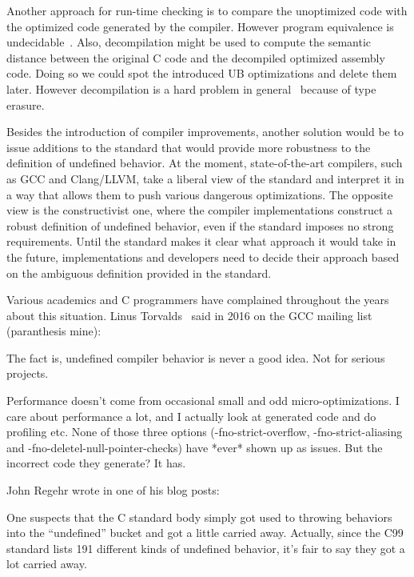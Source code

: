 Another approach for run-time checking is to compare the unoptimized
code with the optimized code generated by the compiler. However program
equivalence is undecidable~\cite{sipser1996introduction}. Also,
decompilation might be used to compute the semantic distance between the
original C code and the decompiled optimized assembly code.  Doing so we
could spot the introduced UB optimizations and delete them later.
However decompilation is a hard problem in
general~\cite{cifuentes1995decompilation} because of type erasure.

Besides the introduction of compiler improvements, another solution
would be to issue additions to the standard that would provide more
robustness to the definition of undefined behavior. At the moment,
state-of-the-art compilers, such as GCC and Clang/LLVM, take a liberal
view of the standard and interpret it in a way that allows them to push
various dangerous optimizations. The opposite view is the constructivist
one, where the compiler implementations construct a robust definition of
undefined behavior, even if the standard imposes no strong requirements.
Until the standard makes it clear what approach it would take in the
future, implementations and developers need to decide their approach
based on the ambiguous definition provided in the standard.

Various academics and C programmers have complained throughout the years
about this situation. Linus Torvalds~\cite{linusgcc} said in 2016 on the
GCC mailing list (paranthesis mine):
\begin{displayquote}
The fact is, undefined compiler behavior is never a good idea. Not for
serious projects.

Performance doesn't come from occasional small and odd
micro-optimizations. I care about performance a lot, and I actually look
at generated code and do profiling etc. None of those three options
(-fno-strict-overflow, -fno-strict-aliasing and
-fno-deletel-null-pointer-checks) have *ever* shown up as issues. But
the incorrect code they generate? It has.
\end{displayquote}

John Regehr wrote in one of his blog posts:
\begin{displayquote}
One suspects that the C standard body simply got used to throwing
behaviors into the “undefined” bucket and got a little carried away.
Actually, since the C99 standard lists 191 different kinds of undefined
behavior, it’s fair to say they got a lot carried away.
\end{displayquote}

